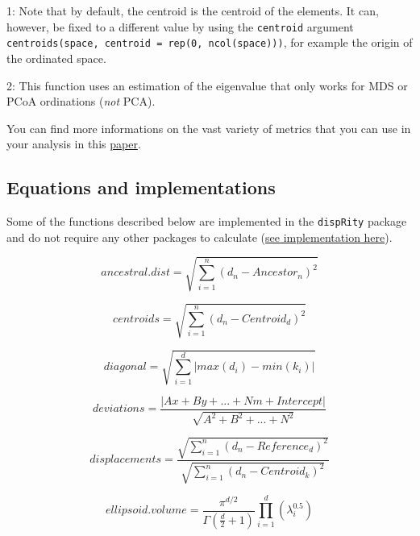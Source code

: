 \documentclass[
]{book}
\begin{document}
1: Note that by default, the centroid is the centroid of the elements.
It can, however, be fixed to a different value by using the \texttt{centroid} argument \texttt{centroids(space,\ centroid\ =\ rep(0,\ ncol(space)))}, for example the origin of the ordinated space.

2: This function uses an estimation of the eigenvalue that only works for MDS or PCoA ordinations (\emph{not} PCA).

You can find more informations on the vast variety of metrics that you can use in your analysis in this \href{https://onlinelibrary.wiley.com/doi/10.1002/ece3.6452}{paper}.

\hypertarget{equations-and-implementations}{%
\subsection{Equations and implementations}\label{equations-and-implementations}}

Some of the functions described below are implemented in the \texttt{dispRity} package and do not require any other packages to calculate (\href{https://github.com/TGuillerme/dispRity/blob/master/R/dispRity.metric.R}{see implementation here}).

\begin{equation}
    ancestral.dist = \sqrt{\sum_{i=1}^{n}{({d}_{n}-Ancestor_{n})^2}}
\end{equation}

\begin{equation}
    centroids = \sqrt{\sum_{i=1}^{n}{({d}_{n}-Centroid_{d})^2}}
\end{equation}

\begin{equation}
    diagonal = \sqrt{\sum_{i=1}^{d}|max(d_i) - min(k_i)|}
\end{equation}

\begin{equation}
    deviations = \frac{|Ax + By + ... + Nm + Intercept|}{\sqrt{A^2 + B^2 + ... + N^2}}
\end{equation}

\begin{equation}
    displacements = \frac{\sqrt{\sum_{i=1}^{n}{({d}_{n}-Reference_{d})^2}}}{\sqrt{\sum_{i=1}^{n}{({d}_{n}-Centroid_{k})^2}}}
\end{equation}

\begin{equation}
    ellipsoid.volume = \frac{\pi^{d/2}}{\Gamma(\frac{d}{2}+1)}\displaystyle\prod_{i=1}^{d} (\lambda_{i}^{0.5})
\end{equation}
\end{document}

